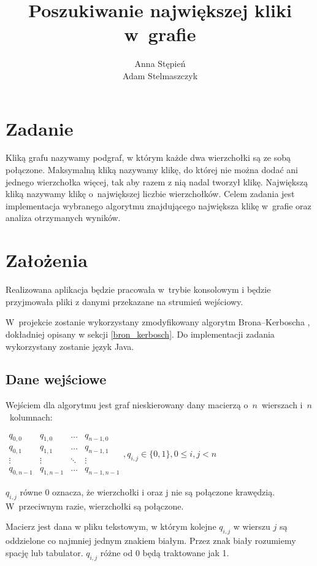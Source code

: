 \documentclass[12pt, a4paper]{article}
\title{\textbf{Poszukiwanie największej kliki w~grafie}}
\author{Anna Stępień \\ Adam Stelmaszczyk}
\date{}
\begin{document}
\maketitle
\tableofcontents

\newpage
\section{Zadanie}

Kliką grafu nazywamy podgraf, w którym każde dwa wierzchołki są ze sobą połączone.
Maksymalną kliką nazywamy klikę, do której nie można dodać ani jednego wierzchołka więcej, tak aby razem z nią nadal tworzył klikę.
Największą kliką nazywamy klikę o~największej liczbie wierzchołków.
Celem zadania jest implementacja wybranego algorytmu znajdującego największa klikę w~grafie oraz analiza otrzymanych wyników.

\section{Założenia}
Realizowana aplikacja będzie pracowała w~trybie konsolowym i będzie przyjmowała pliki z danymi przekazane na strumień wejściowy.

W~projekcie zostanie wykorzystany zmodyfikowany algorytm Brona--Kerboscha \cite{bk}, dokładniej opisany w sekcji \ref{bron_kerbosch}.
Do implementacji zadania wykorzystany zostanie język Java.

\subsection{Dane wejściowe}
Wejściem dla algorytmu jest graf nieskierowany dany macierzą o~$n$~wierszach i~$n$~kolumnach:

\bigskip
$ 
\begin{array}{cccc}
q_{0,0} & q_{1,0} & \ldots & q_{n-1,0} \\
q_{0,1} & q_{1,1} & \ldots & q_{n-1,1} \\
\vdots  & \vdots  & \ddots & \vdots  \\
q_{0,n-1} & q_{1,n-1} & \ldots & q_{n-1,n-1} 
\end{array}
, q_{i,j} \in \{0,1\}, 0 \leq i,j < n
$
\bigskip

$q_{i,j}$ równe 0 oznacza, że wierzchołki i oraz j nie są połączone krawędzią. W~przeciwnym razie, wierzchołki są połączone.
\par\vspace{\baselineskip}
Macierz jest dana w pliku tekstowym, w którym kolejne $q_{i,j}$ w wierszu $j$ są
oddzielone co najmniej jednym znakiem białym. Przez znak biały rozumiemy
spację lub tabulator. $q_{i,j}$ różne od 0 będą traktowane jak 1.
\end{document}
